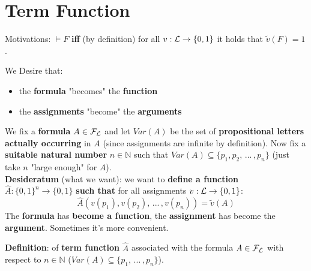 	\section{Term Function}
	Motivations: $\models F$ \textbf{iff} (by definition) for all $v: \mathcal{L} \rightarrow \{0,1\}$ it holds that $\tilde{v}(F) = 1$.

	\noindent
	We Desire that:
	\begin{itemize}
		\item the \textbf{formula} "becomes" the \textbf{function}
		\item the \textbf{assignments} "become" the \textbf{arguments}
	\end{itemize}

	We fix a \textbf{formula} $A \in \mathcal{F}_\mathcal{L}$ and let $Var(A)$ be the set of \textbf{propositional letters actually occurring} in $A$ (since assignments are infinite by definition). Now fix a \textbf{suitable natural number} $n \in \mathbb{N}$ such that $Var(A) \subseteq \{p_1, p_2, \, ... \, , p_n\}$ (just take $n$ "large enough" for $A$).\\

	\textbf{Desideratum} (what we want): we want to \textbf{define a function} $\hat{A}: \{0,1\}^n \rightarrow \{0,1\}$ \textbf{such that} for all assignments $v: \mathcal{L} \rightarrow \{0,1\}$:
	$$ \hat{A} (v(p_1), v(p_2), \, ... \, , v(p_n)) = \tilde{v} (A) $$
	The \textbf{formula} has \textbf{become a function}, the \textbf{assignment} has become the \textbf{argument}. Sometimes it's more convenient.\\

	\newpage

	\textbf{Definition}: of \textbf{term function} $\hat{A}$ associated with the formula $A \in \mathcal{F}_\mathcal{L}$ with respect to $n \in \mathbb{N}$ ($Var(A) \subseteq \{p_1, \, ... \, , p_n\}$).\\

